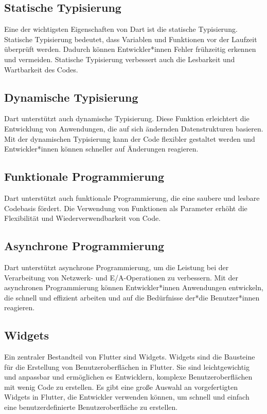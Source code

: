 \subsection{Statische Typisierung}
Eine der wichtigsten Eigenschaften von Dart ist die statische Typisierung. Statische Typisierung bedeutet, dass Variablen und Funktionen vor der Laufzeit überprüft werden. Dadurch können Entwickler*innen Fehler frühzeitig erkennen und vermeiden. Statische Typisierung verbessert auch die Lesbarkeit und Wartbarkeit des Codes.

\subsection{Dynamische Typisierung}
Dart unterstützt auch dynamische Typisierung. Diese Funktion erleichtert die Entwicklung von Anwendungen, die auf sich ändernden Datenstrukturen basieren. Mit der dynamischen Typisierung kann der Code flexibler gestaltet werden und Entwickler*innen können schneller auf Änderungen reagieren.

\subsection{Funktionale Programmierung}
Dart unterstützt auch funktionale Programmierung, die eine saubere und lesbare Codebasis fördert. Die Verwendung von Funktionen als Parameter erhöht die Flexibilität und Wiederverwendbarkeit von Code.

\subsection{Asynchrone Programmierung}
Dart unterstützt asynchrone Programmierung, um die Leistung bei der Verarbeitung von Netzwerk- und E/A-Operationen zu verbessern. Mit der asynchronen Programmierung können Entwickler*innen Anwendungen entwickeln, die schnell und effizient arbeiten und auf die Bedürfnisse der*die Benutzer*innen reagieren.

\subsection{Widgets}

Ein zentraler Bestandteil von Flutter sind Widgets. Widgets sind die Bausteine für die Erstellung von Benutzeroberflächen in Flutter. Sie sind leichtgewichtig und anpassbar und ermöglichen es Entwicklern, komplexe Benutzeroberflächen mit wenig Code zu erstellen. Es gibt eine große Auswahl an vorgefertigten Widgets in Flutter, die Entwickler verwenden können, um schnell und einfach eine benutzerdefinierte Benutzeroberfläche zu erstellen.


